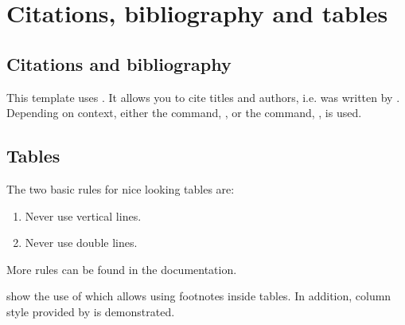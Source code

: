 \cleardoublepage
\chapter{Citations, bibliography and tables}\label{ch:conclusion}

\section{Citations and bibliography}
This template uses . It allows you to cite titles and authors, i.e.  was written by \citeauthor{freierMobileQuantumGravity2016}. Depending on context, either the  command, \textcite{schkolnikEffectWavefrontAberrations2015}, or the  command, \parencite{schkolnikEffectWavefrontAberrations2015}, is used.


\section{Tables}
The two basic rules for nice looking tables are:
\begin{enumerate}
    \item Never use vertical lines.
    \item Never use double lines.
\end{enumerate}
More rules can be found in the  documentation.


 show the use of  which allows using footnotes inside tables. In addition, column style provided by  is demonstrated.

